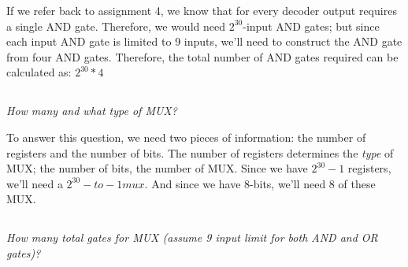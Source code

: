 \documentclass{article}
\begin{document}
If we refer back to assignment 4, we know that for every decoder output requires a single AND gate. Therefore, we would need $2^30$-input AND gates; but since each input AND gate is limited to 9 inputs, we'll need to construct the AND gate from four AND gates. Therefore, the total number of AND gates required can be calculated as: $2^30 * 4$

\subsection{}
\textit{How many and what type of MUX?}

To answer this question, we need two pieces of information: the number of registers and the number of bits.  The number of registers determines the \textit{type} of MUX; the number of bits, the number of MUX.  Since we have $2^{30}-1$ registers, we'll need a $2^{30}-to-1 mux$. And since we have 8-bits, we'll need 8 of these MUX.

\subsection{}
\textit{How many total gates for MUX (assume 9 input limit for both AND and OR gates)?}
\end{document}
